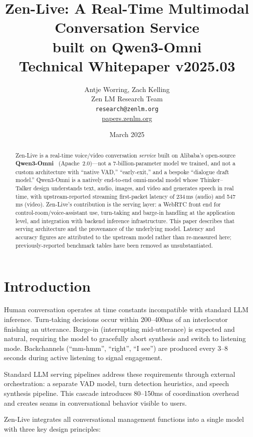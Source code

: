 \documentclass[11pt,a4paper]{article}
\title{\textbf{Zen-Live: A Real-Time Multimodal Conversation Service\\
built on Qwen3-Omni}\\[0.5em]
\large Technical Whitepaper v2025.03}
\author{Antje Worring, Zach Kelling \\ Zen LM Research Team\\
\texttt{research@zenlm.org}\\
\href{https://papers.zenlm.org}{papers.zenlm.org}}
\date{March 2025}
\begin{document}
\maketitle

\begin{abstract}
Zen-Live is a real-time voice/video conversation \emph{service} built on Alibaba's
open-source \textbf{Qwen3-Omni}~\cite{qwen3omni} (Apache~2.0)---not a 7-billion-parameter
model we trained, and not a custom architecture with ``native VAD,'' ``early-exit,'' and
a bespoke ``dialogue draft model.'' Qwen3-Omni is a natively end-to-end omni-modal
model whose Thinker--Talker design understands text, audio, images, and video and
generates speech in real time, with upstream-reported streaming first-packet latency of
234\,ms (audio) and 547\,ms (video). Zen-Live's contribution is the serving layer: a
WebRTC front end for control-room/voice-assistant use, turn-taking and barge-in handling
at the application level, and integration with backend inference infrastructure. This
paper describes that serving architecture and the provenance of the underlying model.
Latency and accuracy figures are attributed to the upstream model rather than
re-measured here; previously-reported benchmark tables have been removed as
unsubstantiated.
\end{abstract}

\tableofcontents
\newpage

\section{Introduction}

Human conversation operates at time constants incompatible with standard LLM inference. Turn-taking decisions occur within 200--400ms of an interlocutor finishing an utterance. Barge-in (interrupting mid-utterance) is expected and natural, requiring the model to gracefully abort synthesis and switch to listening mode. Backchannels (``mm-hmm'', ``right'', ``I see'') are produced every 3--8 seconds during active listening to signal engagement.

Standard LLM serving pipelines address these requirements through external orchestration: a separate VAD model, turn detection heuristics, and speech synthesis pipeline. This cascade introduces 80--150ms of coordination overhead and creates seams in conversational behavior visible to users.

Zen-Live integrates all conversational management functions into a single model with three key design principles:
\end{document}

